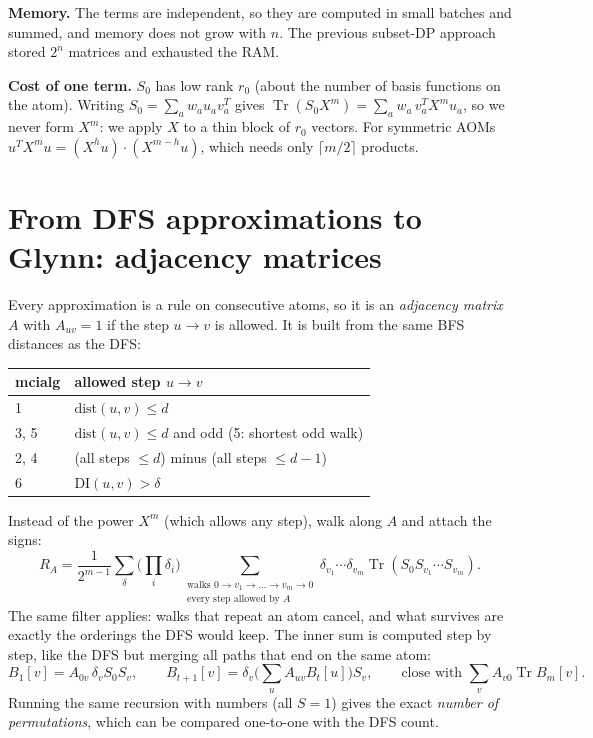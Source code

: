 \documentclass[11pt,a4paper]{article}
\begin{document}
\textbf{Memory.} The terms are independent, so they are computed in small batches and summed, and memory does not grow
with $n$. The previous subset-DP approach stored $2^n$ matrices and exhausted the RAM.

\textbf{Cost of one term.} $S_0$ has low rank $r_0$ (about the number of basis functions on the atom). Writing
$S_0=\sum_a w_a u_a v_a^{T}$ gives $\operatorname{Tr}(S_0X^m)=\sum_a w_a\, v_a^{T}X^m u_a$, so we never form $X^m$: we
apply $X$ to a thin block of $r_0$ vectors. For symmetric AOMs $u^TX^mu=(X^{h}u)\cdot(X^{m-h}u)$, which needs only
$\lceil m/2\rceil$ products.

\section{From DFS approximations to Glynn: adjacency matrices}
Every approximation is a rule on consecutive atoms, so it is an \emph{adjacency matrix} $A$ with $A_{uv}=1$ if the
step $u\to v$ is allowed. It is built from the same BFS distances as the DFS:
\begin{center}
\begin{tabular}{ll}
\toprule
mcialg & allowed step $u\to v$\\ \midrule
1 & $\text{dist}(u,v)\le d$\\
3, 5 & $\text{dist}(u,v)\le d$ and odd (5: shortest odd walk)\\
2, 4 & (all steps $\le d$) minus (all steps $\le d-1$)\\
6 & $\text{DI}(u,v)>\delta$\\ \bottomrule
\end{tabular}
\end{center}
Instead of the power $X^m$ (which allows any step), walk along $A$ and attach the signs:
\[
R_A=\frac{1}{2^{m-1}}\sum_{\delta}\Big(\prod_i\delta_i\Big)\!\!\sum_{\substack{\text{walks } 0\to v_1\to\dots\to v_m\to0\\ \text{every step allowed by }A}}\!\!\delta_{v_1}\cdots\delta_{v_m}\operatorname{Tr}(S_0S_{v_1}\cdots S_{v_m}).
\]
The same filter applies: walks that repeat an atom cancel, and what survives are exactly the orderings the DFS would keep.
The inner sum is computed step by step, like the DFS but merging all paths that end on the same atom:
\[
B_1[v]=A_{0v}\,\delta_vS_0S_v,\qquad B_{t+1}[v]=\delta_v\Big(\sum_u A_{uv}B_t[u]\Big)S_v,\qquad \text{close with } \sum_vA_{v0}\operatorname{Tr}B_m[v].
\]
Running the same recursion with numbers (all $S=1$) gives the exact \emph{number of permutations}, which can be compared
one-to-one with the DFS count.
\end{document}
